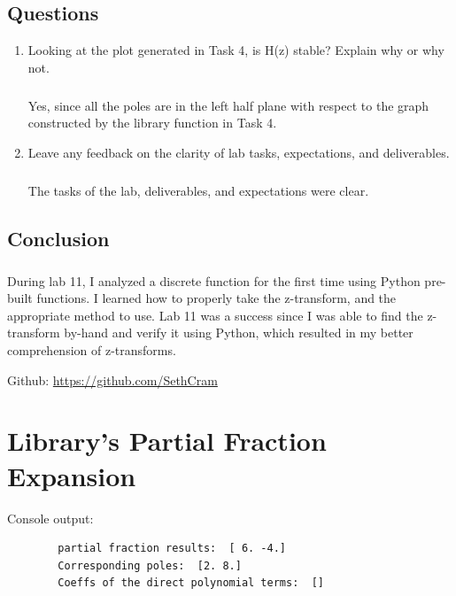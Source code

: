 \documentclass[12pt]{report}
\begin{document}
\section{Questions} %
    \begin{enumerate}
        \item Looking at the plot generated in Task 4, is H(z) stable? Explain why or why not.
        \paragraph{} Yes, since all the poles are in the left half plane with respect to the graph constructed by the library function in Task 4. 
                
        \item Leave any feedback on the clarity of lab tasks, expectations, and deliverables.
        \paragraph{} The tasks of the lab, deliverables, and expectations were clear. 
    \end{enumerate}

\section{Conclusion}


    \paragraph{} During lab 11, I analyzed a discrete function for the first time using Python pre-built functions. I learned how to properly take the z-transform, and the appropriate method to use. Lab 11 was a success since I was able to find the z-transform by-hand and verify it using Python, which resulted in my better comprehension of z-transforms.
    
    Github: \url{https://github.com/SethCram} 

\appendix

\chapter{Library's Partial Fraction Expansion}
     Console output:
    \begin{lstlisting}
        partial fraction results:  [ 6. -4.]
        Corresponding poles:  [2. 8.]
        Coeffs of the direct polynomial terms:  []  
    \end{lstlisting}

\newpage
\end{document}
